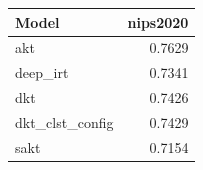 \begin{tabular}{lr}
\toprule
Model & nips2020 \\
\midrule
akt & 0.7629 \\
deep\_irt & 0.7341 \\
dkt & 0.7426 \\
dkt\_clst\_config & 0.7429 \\
sakt & 0.7154 \\
\bottomrule
\end{tabular}
